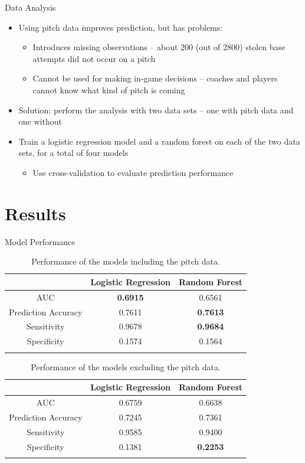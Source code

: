 \documentclass[10pt]{beamer}
\begin{document}
\begin{frame}{Data Analysis}
\begin{itemize}
    \item Using pitch data improves prediction, but has problems:
    \begin{itemize}
        \item Introduces missing observations -- about 200 (out of 2800) stolen base attempts did not occur on a pitch

        \item Cannot be used for making in-game decisions -- coaches and players cannot know what kind of pitch is coming
    \end{itemize}
    \vspace{3mm}
    \item Solution: perform the analysis with two data sets -- one with pitch data and one without
    \vspace{3mm}
    \item Train a logistic regression model and a random forest on each of the two data sets, for a total of four models
    \begin{itemize}
        \item Use cross-validation to evaluate prediction performance
    \end{itemize}
\end{itemize}
\end{frame}


\section{Results}
\begin{frame}{Model Performance}
    \begin{longtable}{c c c}
        \hline
        & Logistic Regression & Random Forest \\
        \hline
        AUC & \textbf{0.6915} & 0.6561 \\
        Prediction Accuracy & 0.7611 & \textbf{0.7613} \\
        Sensitivity & 0.9678 & \textbf{0.9684} \\
        Specificity & 0.1574 & 0.1564 \\
        \hline
        \caption{Performance of the models including the pitch data.}
        \label{results_tab1}
    \end{longtable}
    \begin{longtable}{c c c}
        \hline
        & Logistic Regression & Random Forest \\
        \hline
        AUC & 0.6759 & 0.6638 \\
        Prediction Accuracy & 0.7245 & 0.7361 \\
        Sensitivity & 0.9585 & 0.9400 \\
        Specificity & 0.1381 & \textbf{0.2253} \\
        \hline
        \caption{Performance of the models excluding the pitch data.}
        \label{results_tab2}
    \end{longtable}
\end{frame}
\end{document}
